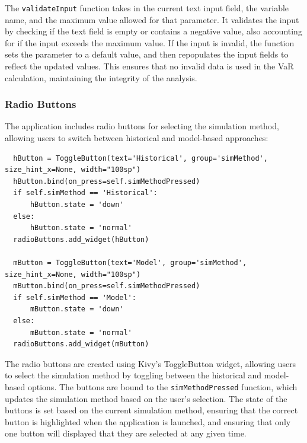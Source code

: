 \documentclass{article}
\begin{document}
\vspace{0.3cm}
The \texttt{validateInput} function takes in the current text input field, the variable name, and the maximum value allowed for that parameter. It validates the input by checking if the text field is empty or contains a negative value, also accounting for if the input exceeds the maximum value. If the input is invalid, the function sets the parameter to a default value, and then repopulates the input fields to reflect the updated values. This ensures that no invalid data is used in the VaR calculation, maintaining the integrity of the analysis.\\\vspace{0.3cm}

\subsubsection{Radio Buttons}
The application includes radio buttons for selecting the simulation method, allowing users to switch between historical and model-based approaches:

\begin{verbatim}
  hButton = ToggleButton(text='Historical', group='simMethod', size_hint_x=None, width="100sp")
  hButton.bind(on_press=self.simMethodPressed)
  if self.simMethod == 'Historical':
      hButton.state = 'down'
  else:
      hButton.state = 'normal'
  radioButtons.add_widget(hButton)
  
  mButton = ToggleButton(text='Model', group='simMethod', size_hint_x=None, width="100sp")
  mButton.bind(on_press=self.simMethodPressed)
  if self.simMethod == 'Model':
      mButton.state = 'down'
  else:
      mButton.state = 'normal'
  radioButtons.add_widget(mButton)
\end{verbatim}

\vspace{0.3cm}
The radio buttons are created using Kivy's ToggleButton widget, allowing users to select the simulation method by toggling between the historical and model-based options. The buttons are bound to the \texttt{simMethodPressed} function, which updates the simulation method based on the user's selection. The state of the buttons is set based on the current simulation method, ensuring that the correct button is highlighted when the application is launched, and ensuring that only one button will displayed that they are selected at any given time.\\\vspace{0.3cm}
\end{document}
